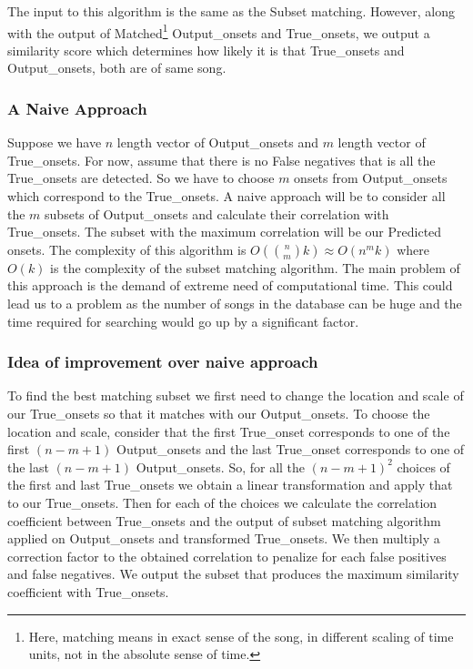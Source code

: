 \documentclass[10pt]{article}
\begin{document}
The input to this algorithm is the same as the Subset matching. However, along with the output of Matched\footnote{Here, matching means in exact sense of the song, in different scaling of time units, not in the absolute sense of time.} Output\_onsets and True\_onsets, we output a similarity score which determines how likely it is that True\_onsets and Output\_onsets, both are of same song.

\subsubsection{A Naive Approach}
Suppose we have $n$ length vector of Output\_onsets and $m$ length vector of True\_onsets. For now, assume that there is no False negatives that is all the True\_onsets are detected. So we have to choose $m$ onsets from Output\_onsets which correspond to the True\_onsets. A naive approach will be to consider all the $m$ subsets of Output\_onsets and calculate their correlation with True\_onsets. The subset with the maximum correlation will be our Predicted onsets. The complexity of this algorithm is $O\left(\binom{n}{m}k\right) \approx O(n^mk)$ where $O(k)$ is the complexity of the subset matching algorithm. The main problem of this approach is the demand of extreme need of computational time. This could lead us to a problem as the number of songs in the database can be huge and the time required for searching would go up by a significant factor. 

\subsubsection{Idea of improvement over naive approach}
To find the best matching subset we first need to change the location and scale of our True\_onsets so that it matches with our Output\_onsets. To choose the location and scale, consider that the first True\_onset corresponds to one of the first $(n-m+1)$ Output\_onsets and the last True\_onset corresponds to one of the last $(n-m+1)$ Output\_onsets. So, for all the $(n-m+1)^2$ choices of the first and last True\_onsets we obtain a linear transformation and apply that to our True\_onsets. Then for each of the choices we calculate the correlation coefficient between True\_onsets and the output of subset matching algorithm applied on Output\_onsets and transformed True\_onsets. We then multiply a correction factor to the obtained correlation to penalize for each false positives and false negatives. We output the subset that produces the maximum similarity coefficient with True\_onsets.
\end{document}
